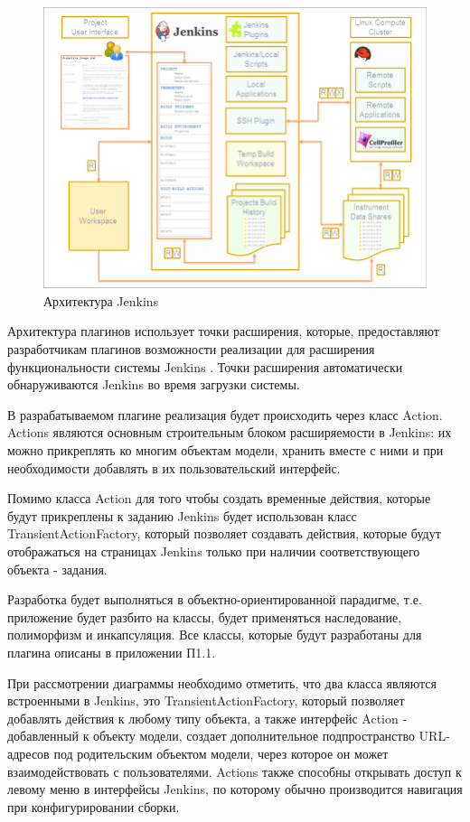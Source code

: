 \begin{figure}[ht!] 
	\center
	\includegraphics [scale=0.47] {my_folder/images//ArchitectureJenkins}
	\caption{Архитектура Jenkins \cite{article}} 
	\label{fig:ArchitectureJenkins}  
\end{figure}


Архитектура плагинов использует точки расширения, которые, предоставляют разработчикам плагинов возможности реализации для расширения функциональности системы Jenkins \cite{atchplugin}. Точки расширения автоматически обнаруживаются Jenkins во время загрузки системы.

В разрабатываемом плагине реализация будет происходить через класс Action. Actions являются основным строительным блоком расширяемости в Jenkins: их можно прикреплять ко многим объектам модели, хранить вместе с ними и при необходимости добавлять в их пользовательский интерфейс.

Помимо класса Action для того чтобы создать временные действия, которые будут прикреплены к заданию Jenkins будет использован класс TransientActionFactory, который позволяет создавать действия, которые будут отображаться на страницах Jenkins только при наличии соответствующего объекта - задания.

Разработка будет выполняться в объектно-ориентированной парадигме, т.е. приложение будет разбито на классы, будет применяться наследование, полиморфизм и инкапсуляция. Все классы, которые будут разработаны для плагина описаны в приложении П1.1. 

При рассмотрении диаграммы необходимо отметить, что два класса являются встроенными в Jenkins, это TransientActionFactory, который позволяет добавлять действия к любому типу объекта, а также интерфейс Action - добавленный к объекту модели, создает дополнительное подпространство URL-адресов под родительским объектом модели, через которое он может взаимодействовать с пользователями. Actions также способны открывать доступ к левому меню в интерфейсы Jenkins, по которому обычно производится навигация при конфигурировании сборки.

